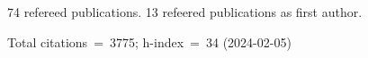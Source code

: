 74 refereed publications. 13 refeered publications as first author.

Total citations~=~3775; h-index~=~34 (2024-02-05)